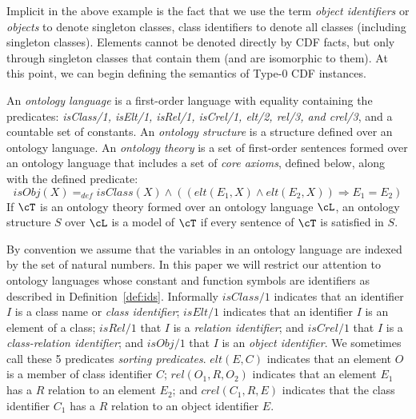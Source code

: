 Implicit in the above example is the fact that we use the term {\em
object identifiers} or {\em objects} to denote singleton classes,
class identifiers to denote all classes (including singleton classes).
Elements cannot be denoted directly by CDF facts, but only through
singleton classes that contain them (and are isomorphic to them).  At
this point, we can begin defining the semantics of Type-0 CDF
instances.

\begin{definition} \label{def:ontolang}
  
%
An {\em ontology language} is a first-order language with equality
containing the predicates: {\em isClass/1, isElt/1, isRel/1, isCrel/1,
elt/2, rel/3, and crel/3}, and a countable set of constants.  An {\em
ontology structure} is a structure defined over an ontology language.
An {\em ontology theory} is a set of first-order sentences formed over
an ontology language that includes a set of {\em core axioms}, defined
below, along with the defined predicate:
\[
isObj(X) =_{def} isClass(X) \wedge 
	((elt(E_1,X) \wedge elt(E_2,X)) \Rightarrow E_1 = E_2)
\]
If $\cT$ is an ontology theory formed over an ontology
language $\cL$, an ontology structure $S$ over $\cL$ is a model of
$\cT$ if every sentence of $\cT$ is satisfied in $S$.
\end{definition}

By convention we assume that the variables in an ontology language are
indexed by the set of natural numbers.  In this paper we will restrict
our attention to ontology languages whose constant and function
symbols are identifiers as described in Definition~\ref{def:ids}.
Informally $isClass/1$ indicates that an identifier $I$ is a class
name or {\em class identifier}; $isElt/1$ indicates that an identifier
$I$ is an element of a class; $isRel/1$ that $I$ is a {\em relation
identifier}; and $isCrel/1$ that $I$ is a {\em class-relation
identifier}; and $isObj/1$ that $I$ is an {\em object identifier}.  We
sometimes call these 5 predicates {\em sorting predicates}.
$elt(E,C)$ indicates that an element $O$ is a member of class
identifier $C$; $rel(O_1,R,O_2)$ indicates that an element $E_1$ has a
$R$ relation to an element $E_2$; and $crel(C_1,R,E)$ indicates that
the class identifier $C_1$ has a $R$ relation to an object identifier
$E$.

